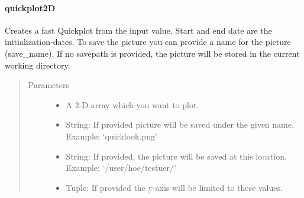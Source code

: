 \documentclass[letterpaper,10pt,english]{sphinxmanual}
\begin{document}
\begin{fulllineitems}
\begin{fulllineitems}
\begin{quote}
\begin{description}
\end{description}\end{quote}

\end{fulllineitems}



\paragraph{quickplot2D}
\label{\detokenize{generated/MPPy.Instruments.Radar.Radar.quickplot2D:quickplot2d}}\label{\detokenize{generated/MPPy.Instruments.Radar.Radar.quickplot2D::doc}}

\begin{fulllineitems}
\label{\detokenize{generated/MPPy.Instruments.Radar.Radar.quickplot2D:MPPy.Instruments.Radar.Radar.quickplot2D}}
Creates a fast Quickplot from the input value. Start and end date are the initialization-dates. To save the
picture you can provide a name for the picture (save\_name). If no savepath is provided, the picture will be
stored in the current working directory.
\begin{quote}\begin{description}
\item[{Parameters}] \leavevmode\begin{itemize}
\item {} 
 \textendash{} A 2-D array which you want to plot.

\item {} 
 \textendash{} String: If provided picture will be saved under the given name. Example: ‘quicklook.png’

\item {} 
 \textendash{} String: If provided, the picture will be saved at this location. Example: ‘/user/hoe/testuer/’

\item {} 
 \textendash{} Tuple: If provided the y-axis will be limited to these values.

\end{itemize}

\end{description}\end{quote}

\end{fulllineitems}
\end{fulllineitems}
\end{document}
